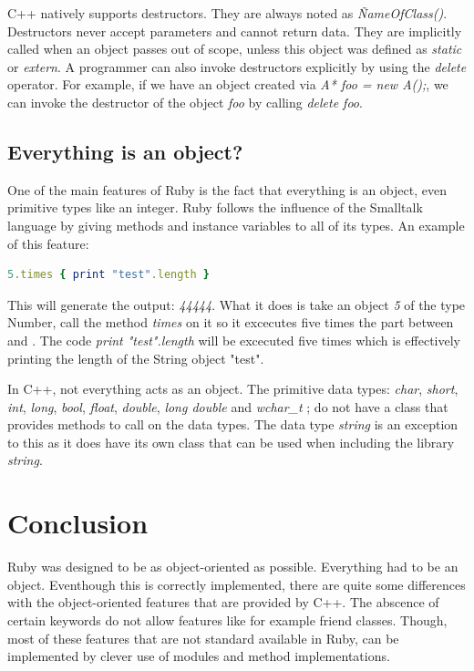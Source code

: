 \documentclass[10pt,a4paper,twocolumn]{article}
\begin{document}
C++ natively supports destructors. They are always noted as \textit{\~NameOfClass()}. Destructors never accept parameters and cannot return data. They are implicitly called when an object passes out of scope, unless this object was defined as \textit{static} or \textit{extern}. A programmer can also invoke destructors explicitly by using the \textit{delete} operator. For example, if we have an object created via \textit{A* foo = new A();}, we can invoke the destructor of the object \textit{foo} by calling \textit{delete foo}.

\subsection{Everything is an object?} 

One of the main features of Ruby is the fact that everything is an object, even primitive types like an integer. Ruby follows the influence of the Smalltalk language by giving methods and instance variables to all of its types. An example of this feature:

\begin{lstlisting}[language=Ruby]
5.times { print "test".length }
\end{lstlisting}

This will generate the output: \textit{44444}. What it does is take an object \textit{5} of the type Number, call the method \textit{times} on it so it excecutes five times the part between { and }. The code \textit{print "test".length} will be excecuted five times which is effectively printing the length of the String object "test".

In C++, not everything acts as an object. The primitive data types: \textit{char}, \textit{short}, \textit{int}, \textit{long}, \textit{bool}, \textit{float}, \textit{double}, \textit{long double} and \textit{wchar\_t} ; do not have a class that provides methods to call on the data types. The data type \textit{string} is an exception to this as it does have its own class that can be used when including the library \textit{string}.

\section{Conclusion}
Ruby was designed to be as object-oriented as possible. Everything had to be an object. Eventhough this is correctly implemented, there are quite some differences with the object-oriented features that are provided by C++. The abscence of certain keywords do not allow features like for example friend classes. Though, most of these features that are not standard available in Ruby, can be implemented by clever use of modules and method implementations.
\end{document}
